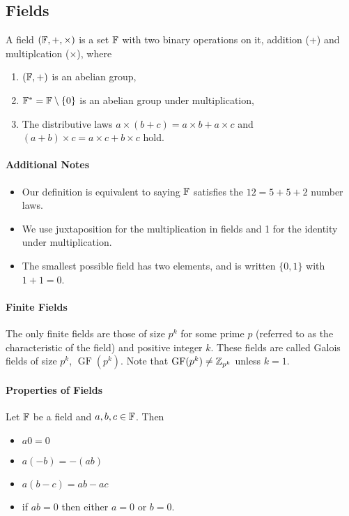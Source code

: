 \subsection{Fields}
A field \((\mathbb{F}, +, \times)\) is a set \(\mathbb{F}\) with two binary operations on it, addition (+) and multiplcation (\(\times\)), where
\begin{enumerate}
    \item \((\mathbb{F}, +)\) is an abelian group,
    \item \(\mathbb{F}^* = \mathbb{F}\setminus\{0\}\) is an abelian group under multiplication,
    \item The distributive laws \(a \times (b + c) = a \times b + a \times c\) and \((a+b) \times c = a \times c + b \times c\) hold.
\end{enumerate}

\paragraph{Additional Notes}
\begin{itemize}
    \item Our definition is equivalent to saying \(\mathbb{F}\) satisfies the \(12 = 5 + 5 + 2\) number laws.
    \item We use juxtaposition for the multiplication in fields and 1 for the identity under multiplication.
    \item The smallest possible field has two elements, and is written \(\{0,1\}\) with \(1 + 1 = 0\).
\end{itemize}

\paragraph{Finite Fields}
The only finite fields are those of size \(p^k\) for some prime \(p\) (referred to as the characteristic of the field) and positive integer \(k\). These fields are called Galois fields of size \(p^k\), \(\operatorname{GF}(p^k)\). Note that \(\operatorname{GF}(p^k) \neq \mathbb{Z}_{p^k}\) unless \(k=1\).

\paragraph{Properties of Fields}
Let \(\mathbb{F}\) be a field and \(a,b,c \in \mathbb{F}\). Then
\begin{itemize}
    \item \(a0=0\)
    \item \(a(-b) = -(ab)\)
    \item \(a(b - c) = ab - ac\)
    \item if \(ab = 0\) then either \(a = 0\) or \(b = 0\).
\end{itemize}


